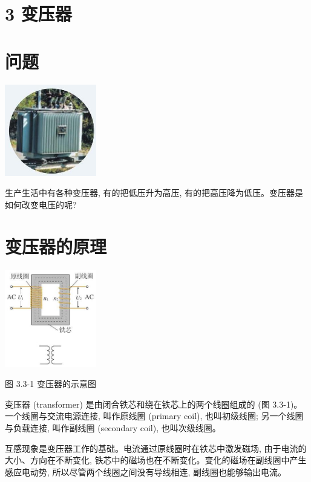 \documentclass[10pt]{article}
\begin{document}
\section*{3 变压器}

\section*{问题}

\begin{center}
\includegraphics[max width=0.3\textwidth]{images/01910e72-c5b7-7ed5-a6d4-fb3a5faefc32_63_453251.jpg}
\end{center}

生产生活中有各种变压器, 有的把低压升为高压, 有的把高压降为低压。变压器是如何改变电压的呢?

\section*{变压器的原理}

\begin{center}
\includegraphics[max width=0.3\textwidth]{images/01910e72-c5b7-7ed5-a6d4-fb3a5faefc32_63_429667.jpg}
\end{center}

图 3.3-1 变压器的示意图

变压器 (transformer) 是由闭合铁芯和绕在铁芯上的两个线圈组成的 (图 3.3-1)。一个线圈与交流电源连接, 叫作原线圈 (primary coil), 也叫初级线圈; 另一个线圈与负载连接, 叫作副线圈 (secondary coil), 也叫次级线圈。

互感现象是变压器工作的基础。电流通过原线圈时在铁芯中激发磁场, 由于电流的大小、方向在不断变化, 铁芯中的磁场也在不断变化。变化的磁场在副线圈中产生感应电动势, 所以尽管两个线圈之间没有导线相连, 副线圈也能够输出电流。
\end{document}
